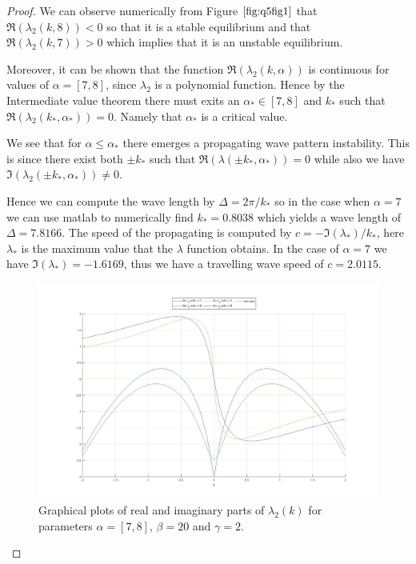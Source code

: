 \documentclass[11pt]{article}
\theoremstyle{quest}
\begin{document}
\begin{proof}
    We can observe numerically from Figure $\ref{fig:q5fig1}$ that $\Re( \lambda_2 (k, 8) ) < 0 $ so that it is a stable equilibrium 
    and that $\Re( \lambda_2 (k, 7) ) > 0$ which implies that it is an unstable equilibrium.
    
    Moreover, it can be shown that the function $\Re( \lambda_2 (k, \alpha) )$ is continuous for values of
    $\alpha = [7,8]$, since $\lambda_2$ is a polynomial function. Hence by the Intermediate value theorem
    there must exits an $\alpha_* \in [7,8] $ and $k_*$ such that $\Re( \lambda_2 (k_*, \alpha_* ) ) = 0$. 
    Namely that $\alpha_*$ is a critical value.

    We see that for $\alpha \leq \alpha_*$ there emerges a propagating wave pattern instability.
    This is since there exist both $\pm k_*$ such that $\Re(\lambda(\pm k_* , \alpha_*)) =0 $ while 
    also we have $\Im(\lambda_2(\pm k_* , \alpha_*)) \neq 0$.
    
    Hence we can compute the wave length by $ \Delta = 2 \pi / k_*$ so in the case when $\alpha =7$ 
    we can use matlab to numerically find $k_* = 0.8038$ which yields a wave length of $ \Delta = 7.8166$.
    The speed of the propagating is computed by $ c = - \Im(\lambda_*) / k_*$, here $\lambda_*$ is the maximum
    value that the $\lambda$ function obtains. In the case of $\alpha =7$ we have
    $\Im(\lambda_*)= -1.6169$, thus we have a travelling wave speed of $c = 2.0115$.

    \begin{figure}[h!]
        \includegraphics[width=\linewidth]{figures/Q5_fig1.jpg}
        \caption{Graphical plots of real and imaginary parts of $\lambda_2 (k)$ for parameters $\alpha=[7,8]$,
        $\beta =20$ and $\gamma =2$.}
        \label{fig:q5fig1}
    \end{figure}

     
    
\end{proof}
\clearpage
\end{document}
